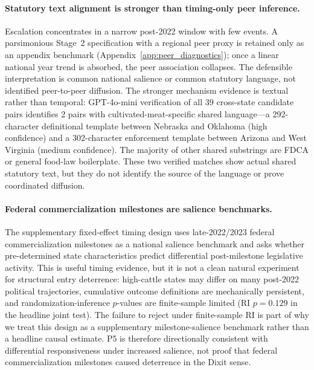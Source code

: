 \documentclass[12pt]{article}
\begin{document}
\paragraph{Statutory text alignment is stronger than timing-only peer inference.}  Escalation concentrates in a narrow post-2022 window with few events.  A parsimonious Stage~2 specification with a regional peer proxy is retained only as an appendix benchmark (Appendix~\ref{app:peer_diagnostics}); once a linear national year trend is absorbed, the peer association collapses.  The defensible interpretation is common national salience or common statutory language, not identified peer-to-peer diffusion.  The stronger mechanism evidence is textual rather than temporal: GPT-4o-mini verification of all 39 cross-state candidate pairs identifies 2 pairs with cultivated-meat-specific shared language---a 292-character definitional template between Nebraska and Oklahoma (high confidence) and a 302-character enforcement template between Arizona and West Virginia (medium confidence).  The majority of other shared substrings are FDCA or general food-law boilerplate.  These two verified matches show actual shared statutory text, but they do not identify the source of the language or prove coordinated diffusion.

\paragraph{Federal commercialization milestones are salience benchmarks.}  The supplementary fixed-effect timing design uses late-2022/2023 federal commercialization milestones as a national salience benchmark and asks whether pre-determined state characteristics predict differential post-milestone legislative activity.  This is useful timing evidence, but it is not a clean natural experiment for structural entry deterrence: high-cattle states may differ on many post-2022 political trajectories, cumulative outcome definitions are mechanically persistent, and randomization-inference $p$-values are finite-sample limited (RI $p = 0.129$ in the headline joint test).  The failure to reject under finite-sample RI is part of why we treat this design as a supplementary milestone-salience benchmark rather than a headline causal estimate.  P5 is therefore directionally consistent with differential responsiveness under increased salience, not proof that federal commercialization milestones caused deterrence in the Dixit sense.
\end{document}
